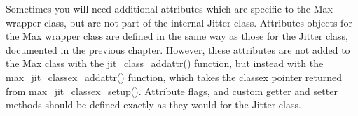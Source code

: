 Sometimes you will need additional attributes which are specific to the Max wrapper class, but are not part of the internal Jitter class. Attributes objects for the Max wrapper class are defined in the same way as those for the Jitter class, documented in the previous chapter. However, these attributes are not added to the Max class with the \hyperlink{group__classmod_ga37e39db544b4d73596da1557e6c7563a}{jit\_\-class\_\-addattr()} function, but instead with the \hyperlink{group__maxwrapmod_ga888aa461197db2e7ef2fb0ae34479c3e}{max\_\-jit\_\-classex\_\-addattr()} function, which takes the classex pointer returned from \hyperlink{group__maxwrapmod_ga773b6e6430d9de2e295419c7f038979e}{max\_\-jit\_\-classex\_\-setup()}. Attribute flags, and custom getter and setter methods should be defined exactly as they would for the Jitter class. 